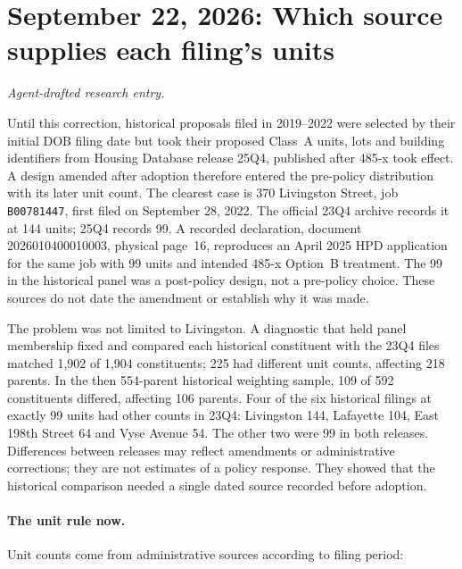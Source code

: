 \clearpage
\section*{September 22, 2026: Which source supplies each filing's units}
\textit{Agent-drafted research entry.}

Until this correction, historical proposals filed in 2019--2022 were selected
by their initial DOB filing date but took their proposed Class~A units, lots
and building identifiers from Housing Database release 25Q4, published after
485-x took effect. A design amended after adoption therefore entered the
pre-policy distribution with its later unit count. The clearest case is 370
Livingston Street, job \texttt{B00781447}, first filed on September 28, 2022.
The official 23Q4 archive records it at 144 units; 25Q4 records 99. A recorded
declaration, document 2026010400010003, physical page~16, reproduces an April
2025 HPD application for the same job with 99 units and intended 485-x
Option~B treatment. The 99 in the historical panel was a post-policy design,
not a pre-policy choice. These sources do not date the amendment or establish
why it was made.

The problem was not limited to Livingston. A diagnostic that held panel
membership fixed and compared each historical constituent with the 23Q4 files
matched 1,902 of 1,904 constituents; 225 had different unit counts, affecting
218 parents. In the then 554-parent historical weighting sample, 109 of 592
constituents differed, affecting 106 parents. Four of the six historical
filings at exactly 99 units had other counts in 23Q4: Livingston 144,
Lafayette 104, East 198th Street 64 and Vyse Avenue 54. The other two were 99
in both releases. Differences between releases may reflect amendments or
administrative corrections; they are not estimates of a policy response. They
showed that the historical comparison needed a single dated source recorded
before adoption.

\paragraph{The unit rule now.}
Unit counts come from administrative sources according to filing period:

